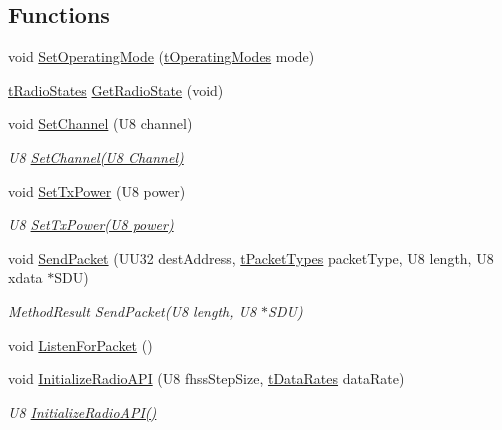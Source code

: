 \subsection*{Functions}
\begin{DoxyCompactItemize}
\item 
void \hyperlink{group___radio_ga34afb92015b77c5e212113dc24c666d9}{Set\-Operating\-Mode} (\hyperlink{group___radio_gab7388600f063db50b675fae0560b237e}{t\-Operating\-Modes} mode)
\item 
\hyperlink{group___radio_gad2b6877d3d2c1164d3373dc9b98cab84}{t\-Radio\-States} \hyperlink{group___radio_ga8f4ded58caebb26cf4d2b83c46cfed13}{Get\-Radio\-State} (void)
\item 
void \hyperlink{group___radio_ga78b5c441166756d9af91a646e0b2730f}{Set\-Channel} (U8 channel)
\begin{DoxyCompactList}\small\item\em U8 \hyperlink{group___radio_ga78b5c441166756d9af91a646e0b2730f}{Set\-Channel(\-U8 Channel)} \end{DoxyCompactList}\item 
void \hyperlink{group___radio_gae43e030b3b920054bc17bd3048537a88}{Set\-Tx\-Power} (U8 power)
\begin{DoxyCompactList}\small\item\em U8 \hyperlink{group___radio_gae43e030b3b920054bc17bd3048537a88}{Set\-Tx\-Power(\-U8 power)} \end{DoxyCompactList}\item 
void \hyperlink{group___radio_ga9d15a38533c839197cfc7a84ca016de9}{Send\-Packet} (U\-U32 dest\-Address, \hyperlink{group___radio_gaba81c4c5fad7e2e0cef01f8e6c710ecb}{t\-Packet\-Types} packet\-Type, U8 length, U8 xdata $\ast$S\-D\-U)
\begin{DoxyCompactList}\small\item\em Method\-Result Send\-Packet(\-U8 length, U8 $\ast$\-S\-D\-U) \end{DoxyCompactList}\item 
void \hyperlink{group___radio_gacbe89d67bb04cbb15e4f12eaf4c7558e}{Listen\-For\-Packet} ()
\item 
void \hyperlink{group___radio_gafd087444df2d9138356991afbc1135a6}{Initialize\-Radio\-A\-P\-I} (U8 fhss\-Step\-Size, \hyperlink{group___radio_ga8ca09000106eab66e7f5a4998107f805}{t\-Data\-Rates} data\-Rate)
\begin{DoxyCompactList}\small\item\em U8 \hyperlink{group___radio_gafd087444df2d9138356991afbc1135a6}{Initialize\-Radio\-A\-P\-I()} \end{DoxyCompactList}\item 

\end{DoxyCompactItemize}
